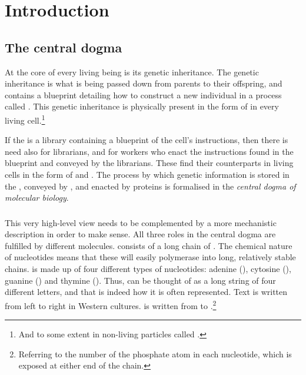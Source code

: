 \chapter{Introduction}


\section{The central dogma}

At the core of every living being is its genetic inheritance. The genetic
inheritance is what is being passed down from parents to their offspring, and
contains a blueprint detailing how to construct a new individual in a process
called . This genetic inheritance is physically present in
the form of \dna in every living cell.\footnote{And to some extent in non-living
particles called .}

If the \dna is a library containing a blueprint of the cell’s instructions, then
there is need also for librarians, and for workers who enact the instructions
found in the blueprint and conveyed by the librarians. These find their
counterparts in living cells in the form of \rna and . The
process by which genetic information is stored in the \dna, conveyed by \rna[s],
and enacted by proteins is formalised in the \emph{central dogma of molecular
biology}.

\begin{figure}[h!]
    \centering
\end{figure}

\subsection{}

This very high-level view needs to be complemented by a more mechanistic
description in order to make sense. All three roles in the central dogma are
fulfilled by different molecules. \dna consists of a long chain of
. The chemical nature of nucleotides means that these will
easily polymerase into long, relatively stable chains. \dna is made up of four
different types of nucleotides: adenine (\nA), cytosine (\nC), guanine (\nG) and
thymine (\nT). Thus, \dna can be thought of as a long string of four different
letters, and that is indeed how it is often represented. Text is written from
left to right in Western cultures. \dna is written from \fivep to
\threep.\footnote{Referring to the number of the phosphate atom in each
nucleotide, which is exposed at either end of the chain.}

